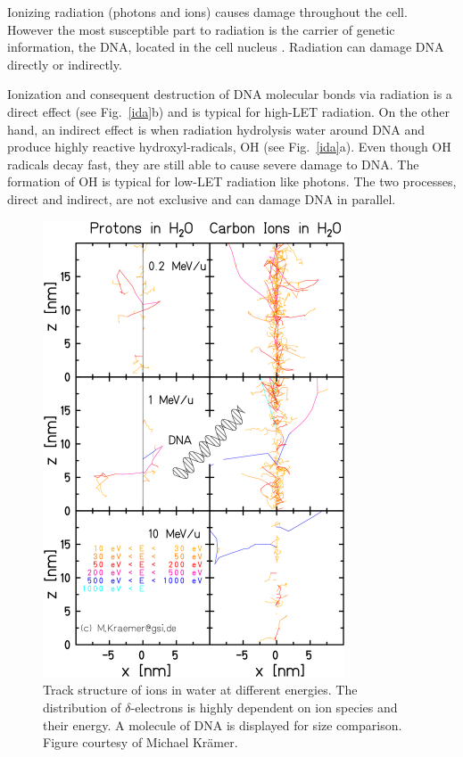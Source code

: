 Ionizing radiation (photons and ions) causes damage throughout the cell. However the most susceptible part to radiation is the
carrier of genetic information, the DNA, located in the cell nucleus \cite{Munro1970}. Radiation can damage DNA directly or indirectly.

Ionization and consequent destruction of DNA molecular bonds via radiation is a direct effect (see Fig.~\ref{ida}b) and is typical for high-LET radiation. On the other hand, an indirect effect is when radiation hydrolysis water around DNA and produce highly reactive hydroxyl-radicals, OH 
(see Fig.~\ref{ida}a). Even though OH radicals decay fast, they are still able to cause severe damage to DNA. The formation of OH is typical for low-LET radiation like photons. The two processes, direct and indirect, are not exclusive and can damage DNA in parallel.


\newpage

\begin{figure}[H]
\begin{center}
\includegraphics[width=0.8\textwidth]{./Fundamentals/Images/trackstructure.png}
\caption{Track structure of ions in water at different energies. The distribution of $\delta$-electrons is highly dependent on ion species and their energy.
A molecule of DNA is displayed for size comparison. Figure courtesy of Michael Kr\"amer.}
\label{track}
\end{center}
\end{figure}


